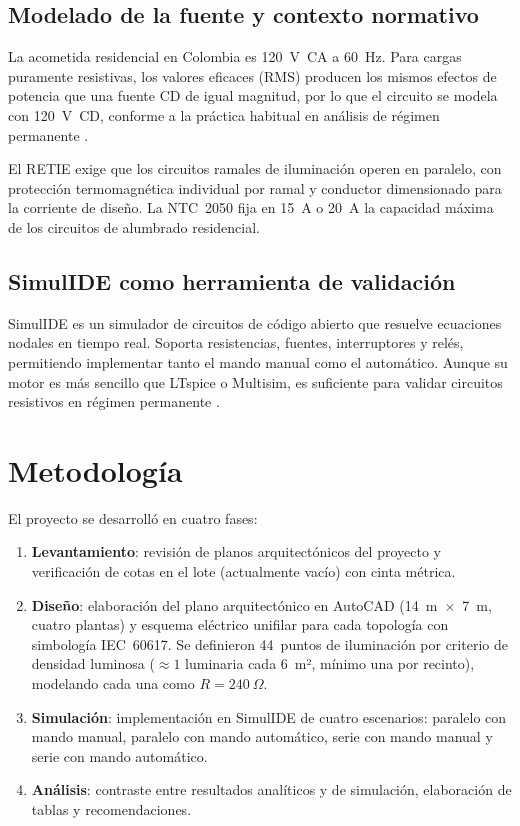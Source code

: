 \subsection{Modelado de la fuente y contexto normativo}

La acometida residencial en Colombia es 120~V~CA a 60~Hz. Para cargas puramente resistivas, los valores eficaces (RMS) producen los mismos efectos de potencia que una fuente CD de igual magnitud, por lo que el circuito se modela con 120~V~CD, conforme a la práctica habitual en análisis de régimen permanente \cite{hayt2012}.

El RETIE exige que los circuitos ramales de iluminación operen en paralelo, con protección termomagnética individual por ramal y conductor dimensionado para la corriente de diseño. La NTC~2050 fija en 15~A o 20~A la capacidad máxima de los circuitos de alumbrado residencial.

\subsection{SimulIDE como herramienta de validación}

SimulIDE es un simulador de circuitos de código abierto que resuelve ecuaciones nodales en tiempo real. Soporta resistencias, fuentes, interruptores y relés, permitiendo implementar tanto el mando manual como el automático. Aunque su motor es más sencillo que LTspice o Multisim, es suficiente para validar circuitos resistivos en régimen permanente \cite{simulide}.

\section{Metodología}

El proyecto se desarrolló en cuatro fases:

\begin{enumerate}
  \item \textbf{Levantamiento}: revisión de planos arquitectónicos del proyecto y verificación de cotas en el lote (actualmente vacío) con cinta métrica.

  \item \textbf{Diseño}: elaboración del plano arquitectónico en AutoCAD (14~m~$\times$~7~m, cuatro plantas) y esquema eléctrico unifilar para cada topología con simbología IEC~60617. Se definieron 44~puntos de iluminación por criterio de densidad luminosa ($\approx 1$ luminaria cada 6~m², mínimo una por recinto), modelando cada una como $R = 240~\Omega$.

  \item \textbf{Simulación}: implementación en SimulIDE de cuatro escenarios: paralelo con mando manual, paralelo con mando automático, serie con mando manual y serie con mando automático.

  \item \textbf{Análisis}: contraste entre resultados analíticos y de simulación, elaboración de tablas y recomendaciones.
\end{enumerate}


